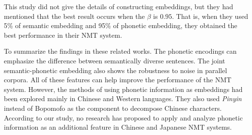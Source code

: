 This study did not give the details of constructing embeddings, but they had mentioned that the best result occurs when the $\beta$ is $0.95$. That is, when they used 5\% of semantic embedding and 95\% of phonetic embedding, they obtained the best performance in their NMT system.

To summarize the findings in these related works. The phonetic encodings can emphasize the difference between semantically diverse sentences. The joint semantic-phonetic embedding also shows the robustness to noise in parallel corpora. All of these features can help improve the performance of the NMT system. However, the methods of using phonetic information as embeddings had been explored mainly in Chinese and Western languages. They also used \textit{Pinyin} instead of Bopomofo as the component to decompose Chinese characters. According to our study, no research has proposed to apply and analyze phonetic information as an additional feature in Chinese and Japanese NMT systems.
